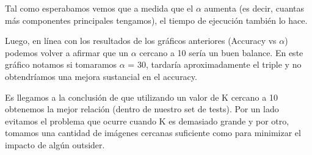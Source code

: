 Tal como esperabamos vemos que a medida que el $\alpha$ aumenta (es decir, cuantas más componentes principales tengamos), el tiempo de ejecución también lo hace.

Luego, en línea con los resultados de los gráficos anteriores (Accuracy vs $\alpha$) podemos volver a afirmar que un $\alpha$ cercano a 10 sería un buen balance. En este gráfico notamos si tomaramos $\alpha$ = 30, tardaría aproximadamente el triple y no obtendríamos una mejora sustancial en el accuracy.



Es llegamos a la conclusión de que utilizando un valor de K cercano a 10 obtenemos la mejor relación (dentro de nuestro set de tests).
Por un lado evitamos el problema que ocurre cuando K es demasiado grande y por otro, tomamos una cantidad de imágenes cercanas suficiente como para minimizar el impacto de algún outsider.


